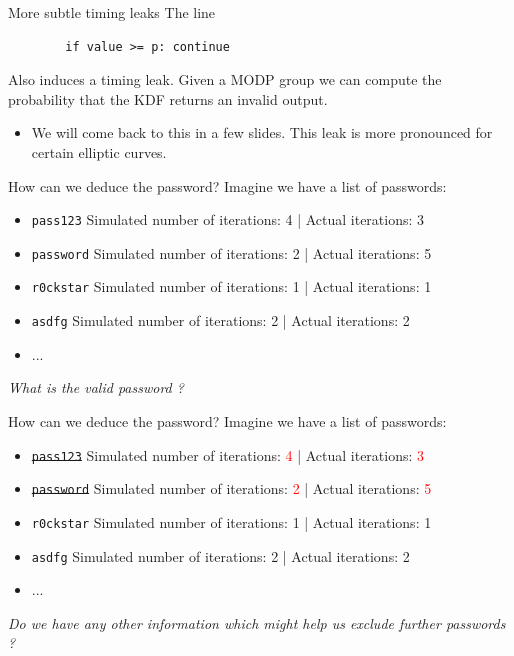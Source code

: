 \documentclass[xcolor=table]{bredelebeamer}
\begin{document}
\begin{frame}{More subtle timing leaks}
    The line
    \begin{verbatim}
        if value >= p: continue
    \end{verbatim}
    Also induces a timing leak. Given a MODP group we can compute the probability that the KDF returns an invalid output. \vspace{30pt}
    \begin{itemize}
        \item We will come back to this in a few slides. This leak is more pronounced for certain elliptic curves.
    \end{itemize}
\end{frame}


\begin{frame}{How can we deduce the password?}
    Imagine we have a list of passwords:
    \begin{itemize}
        \item \texttt{pass123} \hfill Simulated number of iterations: 4 | Actual iterations: 3
        \item \texttt{password} \hfill Simulated number of iterations: 2 | Actual iterations: 5
        \item \texttt{r0ckstar} \hfill Simulated number of iterations: 1 | Actual iterations: 1
        \item \texttt{asdfg} \hfill Simulated number of iterations: 2 | Actual iterations: 2
        \item ...
    \end{itemize}
    \vspace{30pt}
    \textit{ \Large{What is the valid password ?}}
\end{frame}
\begin{frame}{How can we deduce the password?}
    Imagine we have a list of passwords:

    \begin{itemize}
        \item \st{\texttt{pass123}} \hfill Simulated number of iterations: \textcolor{red}{4} | Actual iterations: \textcolor{red}{3}
        \item \st{\texttt{password}} \hfill Simulated number of iterations: \textcolor{red}{2} | Actual iterations: \textcolor{red}{5}
        \item \texttt{r0ckstar} \hfill Simulated number of iterations: 1 | Actual iterations: 1
        \item \texttt{asdfg} \hfill Simulated number of iterations: 2 | Actual iterations: 2
        \item ...
    \end{itemize}
        \vspace{30pt}
        \textit{ \Large{Do we have any other information which might help us exclude further passwords ?}}
\end{frame}
\end{document}
